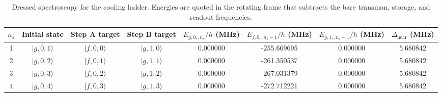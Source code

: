 \documentclass[aps,pra,twocolumn,reprint,floatfix,amsmath,amssymb]{revtex4-2}
\newcommand{\ket}[1]{\lvert #1 \rangle}
\begin{document}
\begin{table}[t]
\caption{Dressed spectroscopy for the cooling ladder. Energies are quoted in the rotating frame that subtracts the bare transmon, storage, and readout frequencies.}
\label{tab:spectroscopy}
\begin{tabular*}{\textwidth}{@{\extracolsep{\fill}}cccccccc}
\toprule
\(n_s\) & Initial state & Step A target & Step B target & \(E_{g,0_r,n_s}/h\) (MHz) & \(E_{f,0_r,n_s-1}/h\) (MHz) & \(E_{g,1_r,n_s-1}/h\) (MHz) & \(\Delta_{\mathrm{near}}\) (MHz) \\
\midrule
1 & \(\ket{g,0,1}\) & \(\ket{f,0,0}\) & \(\ket{g,1,0}\) & 0.000000 & -255.669695 & 0.000000 & 5.680842 \\
2 & \(\ket{g,0,2}\) & \(\ket{f,0,1}\) & \(\ket{g,1,1}\) & 0.000000 & -261.350537 & 0.000000 & 5.680842 \\
3 & \(\ket{g,0,3}\) & \(\ket{f,0,2}\) & \(\ket{g,1,2}\) & 0.000000 & -267.031379 & 0.000000 & 5.680842 \\
4 & \(\ket{g,0,4}\) & \(\ket{f,0,3}\) & \(\ket{g,1,3}\) & 0.000000 & -272.712221 & 0.000000 & 5.680842 \\
\bottomrule
\end{tabular*}
\end{table}
\end{document}
